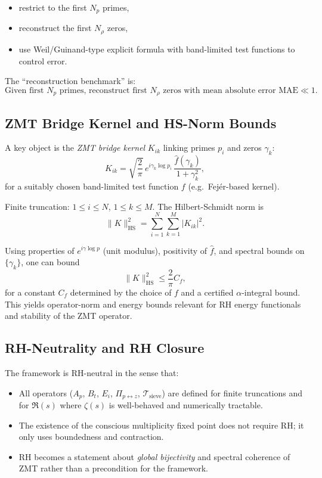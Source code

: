 \documentclass[11pt]{article}
\begin{document}
\begin{itemize}[leftmargin=*]
  \item restrict to the first $N_p$ primes,
  \item reconstruct the first $N_\rho$ zeros,
  \item use Weil/Guinand-type explicit formula with band-limited test functions to control error.
\end{itemize}

The ``reconstruction benchmark'' is:
\[
\text{Given first } N_p \text{ primes, reconstruct first } N_\rho
  \text{ zeros with mean absolute error } \mathrm{MAE}\ll 1.
\]

\subsection{ZMT Bridge Kernel and HS-Norm Bounds}

A key object is the \emph{ZMT bridge kernel} $K_{ik}$ linking primes $p_i$ and zeros $\gamma_k$:
\[
K_{ik}
  =
  \sqrt{\frac{2}{\pi}}
  \,e^{i\gamma_k \log p_i}
  \,\frac{\widehat{f}(\gamma_k)}{1+\gamma_k^2},
\]
for a suitably chosen band-limited test function $f$ (e.g.\ Fejér-based kernel).

Finite truncation: $1\le i\le N$, $1\le k\le M$. The Hilbert-Schmidt norm is
\[
\|K\|_{\mathrm{HS}}^2
  = \sum_{i=1}^N\sum_{k=1}^M |K_{ik}|^2.
\]

Using properties of $e^{i\gamma\log p}$ (unit modulus), positivity of $\widehat{f}$, and spectral bounds on $\{\gamma_k\}$, one can bound
\[
\|K\|_{\mathrm{HS}}^2
  \le \frac{2}{\pi} C_{f},
\]
for a constant $C_f$ determined by the choice of $f$ and a certified $\alpha$-integral bound. This yields operator-norm and energy bounds relevant for RH energy functionals and stability of the ZMT operator.

\subsection{RH-Neutrality and RH Closure}

The framework is RH-neutral in the sense that:

\begin{itemize}[leftmargin=*]
  \item All operators ($A_p$, $B_t$, $E_i$, $\Pi_{p\leftrightarrow z}$, $\mathcal{T}_{\text{sieve}}$) are defined for finite truncations and for $\Re(s)$ where $\zeta(s)$ is well-behaved and numerically tractable.
  \item The existence of the conscious multiplicity fixed point does not require RH; it only uses boundedness and contraction.
  \item RH becomes a statement about \emph{global bijectivity} and spectral coherence of ZMT rather than a precondition for the framework.
\end{itemize}
\end{document}
